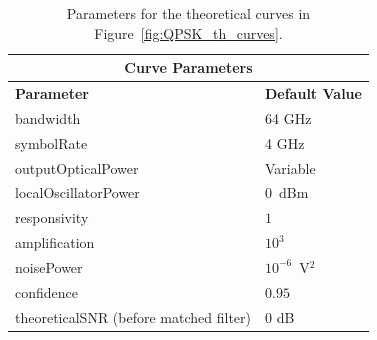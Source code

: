 \begin{refsection}
\begin{table}[H]
	\centering
	\begin{tabular}{|l|l|}
		\hline
		\multicolumn{2}{|c|}{ \textbf{Curve Parameters} } \\
		\hline
		\textbf{Parameter}     & \textbf{Default Value}                                     \\\hline
		bandwidth              & 64 GHz															\\\hline
		symbolRate		       & 4 GHz                                                    		\\\hline
		outputOpticalPower     & Variable                                                   \\ \hline
		localOscillatorPower   & $0$~dBm                                                    \\ \hline
		responsivity           & $1$                                                        \\ \hline
		amplification          & $10^3$                                                     \\ \hline
		noisePower			   & $10^{-6}$~V$^2$                             					\\ \hline
		confidence             & $0.95$                                                     \\ \hline
		theoreticalSNR (before matched filter) &	0 dB								    \\ \hline
	\end{tabular}
	\caption{Parameters for the theoretical curves in Figure~\ref{fig:QPSK_th_curves}.\label{tab:thCurves}}
\end{table}


\end{refsection}

